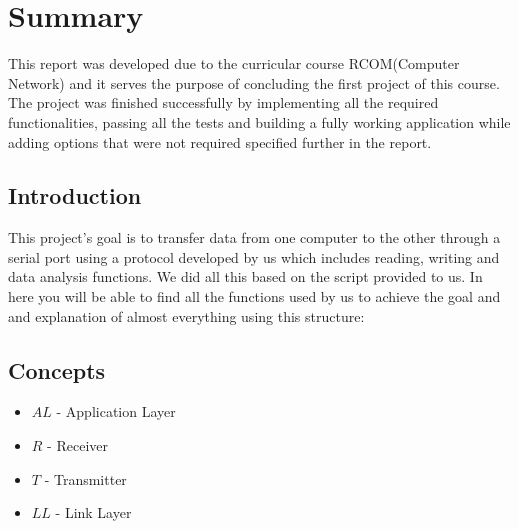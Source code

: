\documentclass[main.tex]{subfiles}
\begin{document}
\section{Summary}
\label{sec:summary}
   
This report was developed due to the curricular course RCOM(Computer Network) and it serves the purpose of concluding the first project of this course.
The project was finished successfully by implementing all the required functionalities, passing all the tests and building a fully working application while adding options that were not required specified further in the report.

\subsection{Introduction}
\label{subsec:intro}

This project’s goal is to transfer data from one computer to the other through a serial port using a protocol developed by us which includes reading, writing and data analysis functions.
We did all this based on the script provided to us.
In here you will be able to find all the functions used by us to achieve the goal and and explanation of almost everything using this structure:


\subsection{Concepts}
\label{subsec:concepts}

\begin{itemize}
\item $AL$ - Application Layer
\item $R$ - Receiver
\item $T$ - Transmitter
\item $LL$ - Link Layer
\end{itemize}
\end{document}
